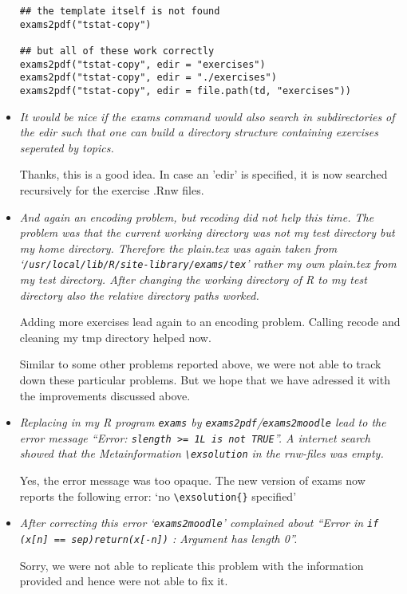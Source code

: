 \documentclass[american]{uibkletter}
\begin{document}
\begin{itemize}
\begin{verbatim}
## the template itself is not found
exams2pdf("tstat-copy")

## but all of these work correctly
exams2pdf("tstat-copy", edir = "exercises")
exams2pdf("tstat-copy", edir = "./exercises")
exams2pdf("tstat-copy", edir = file.path(td, "exercises"))
\end{verbatim}

\item {\it
It would be
nice if the exams command would also search in subdirectories of the edir
such that one can build a directory structure containing exercises
seperated by topics.}

Thanks, this is a good idea. In case an 'edir' is specified, it is now searched
recursively for the exercise .Rnw files.

\item {\it
And again an encoding problem, but recoding did not help this time. The
problem was that the current working directory was not my test directory
but my home directory.  Therefore the plain.tex was again taken from
`\texttt{/usr/local/lib/R/site-library/exams/tex}' rather my own plain.tex from my
test directory.  After changing the working directory of R to my test
directory also the relative directory paths worked.

Adding more exercises lead again to an encoding problem. Calling recode
and cleaning my tmp directory helped now.}

Similar to some other problems reported above, we were not able to track down
these particular problems. But we hope that we have adressed it with the
improvements discussed above.

\item {\it
Replacing in my R program \texttt{exams} by \texttt{exams2pdf}/\texttt{exams2moodle} lead to
the error message ``Error: \texttt{slength >= 1L is not TRUE}''.  A internet search
showed that the Metainformation \verb|\exsolution| in the rnw-files was empty.}

Yes, the error message was too opaque. The new version of exams now reports
the following error: `no \verb|\exsolution{}| specified'

\item {\it
After correcting this error `\texttt{exams2moodle}' complained about ``Error in
\texttt{if (x[n] == sep)}\linebreak \texttt{return(x[-n])} : Argument has length 0''.}

Sorry, we were not able to replicate this problem with the information provided
and hence were not able to fix it.


\end{itemize}
\end{document}
